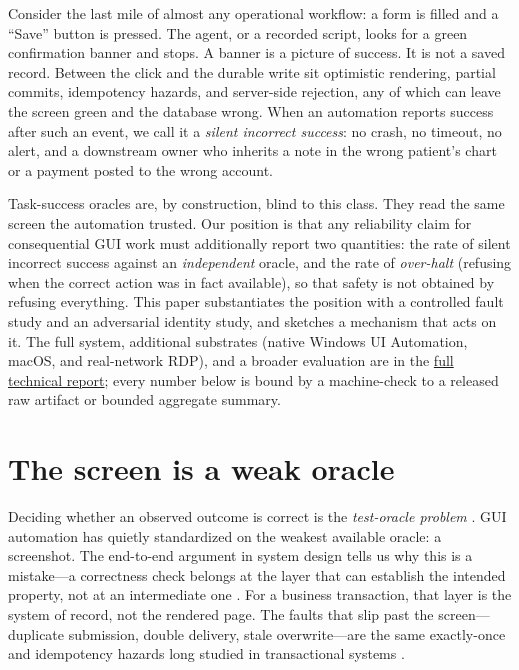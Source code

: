 \documentclass[10pt]{article}
\newcommand{\fullreport}{\href{https://github.com/OpenAdaptAI/openadapt-flow}{full technical report}}
\begin{document}
Consider the last mile of almost any operational workflow: a form is filled and a
``Save'' button is pressed. The agent, or a recorded script, looks for a green
confirmation banner and stops. A banner is a picture of success. It is not a
saved record. Between the click and the durable write sit optimistic rendering,
partial commits, idempotency hazards, and server-side rejection, any of which can
leave the screen green and the database wrong. When an automation reports success
after such an event, we call it a \emph{silent incorrect success}: no crash, no
timeout, no alert, and a downstream owner who inherits a note in the wrong
patient's chart or a payment posted to the wrong account.

Task-success oracles are, by construction, blind to this class. They read the
same screen the automation trusted. Our position is that any reliability claim
for consequential GUI work must additionally report two quantities: the rate of
silent incorrect success against an \emph{independent} oracle, and the rate of
\emph{over-halt} (refusing when the correct action was in fact available), so
that safety is not obtained by refusing everything. This paper substantiates the
position with a controlled fault study and an adversarial identity study, and
sketches a mechanism that acts on it. The full system, additional substrates
(native Windows UI Automation, macOS, and real-network RDP), and a broader
evaluation are in the \fullreport{}; every number below is bound by a
machine-check to a released raw artifact or bounded aggregate summary.

\section{The screen is a weak oracle}
\label{sec:oracle}

Deciding whether an observed outcome is correct is the \emph{test-oracle problem}
\cite{barr2015oracle}. GUI automation has quietly standardized on the weakest
available oracle: a screenshot. The end-to-end argument in system design tells us
why this is a mistake---a correctness check belongs at the layer that can
establish the intended property, not at an intermediate one
\cite{saltzer1984end}. For a business transaction, that layer is the system of
record, not the rendered page. The faults that slip past the screen---duplicate
submission, double delivery, stale overwrite---are the same exactly-once and
idempotency hazards long studied in transactional systems
\cite{gray1981transaction}.
\end{document}
